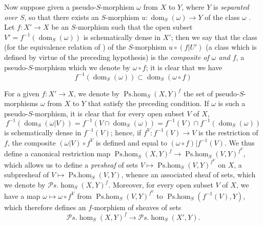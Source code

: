 \begin{env}[20.3.2]\label{IV.20.3.2}
Now suppose given a pseudo-$S$-morphism $\omega$ from $X$ to $Y$, where $Y$ is \emph{separated over $S$}, so that there exists an $S$-morphism $u:\operatorname{dom}_S(\omega)\to Y$ of the class $\omega$ .
Let $f:X'\to X$ be an $S$-morphism such that the open subset $V'=f^{-1}(\operatorname{dom}_S(\omega))$ is schematically dense in $X'$; then we say that the class (for the equivalence relation of ) of the $S$-morphism $u\circ(f|U')$ (a class which is defined by virtue of the preceding hypothesis) is the \emph{composite of $\omega$ and $f$}, a pseudo-$S$-morphism which we denote by $\omega\circ f$; it is clear that we have
\[
\label{IV.20.3.2.1}
  f^{-1}(\operatorname{dom}_S(\omega))\subset\operatorname{dom}_S(\omega\circ f)
  \tag{20.3.2.1}
\]

For a given $f:X'\to X$, we denote by $\operatorname{Ps.hom}_S(X,Y)^f$ the set of pseudo-$S$-morphisms $\omega$ from $X$ to $Y$ that satisfy the preceding condition.
If $\omega$ is such a pseudo-$S$-morphism, it is clear that for every open subset $V$ of $X$,
\[
  f^{-1}(\operatorname{dom}_S(\omega|V))=f^{-1}(V\cap\operatorname{dom}_S(\omega))=f^{-1}(V)\cap f^{-1}(\operatorname{dom}_S(\omega))
\]
is schematically dense in $f^{-1}(V)$; hence, if $f^V:f^{-1}(V)\to V$ is the restriction of $f$, the composite $(\omega|V)\circ f^V$ is defined and equal to $(\omega\circ f)|f^{-1}(V)$.
We thus define a
canonical restriction map $\operatorname{Ps.hom}_S(X,Y)^f\to\operatorname{Ps.hom}_S(V,Y)^{f^V}$, which allows us to define a \emph{presheaf} of sets $V\mapsto\operatorname{Ps.hom}_S(V,Y)^{f^V}$ on $X$, a subpresheaf of $V\mapsto\operatorname{Ps.hom}_S(V,Y)$, whence an associated sheaf of sets, which we denote by $\mathscr{P}\!s.\!\operatorname{hom}_S(X,Y)^f$.
Moreover, for every open subset $V$ of $X$, we have a map $\omega\mapsto\omega\circ f^V$ from $\operatorname{Ps.hom}_S(V,Y)^{f^V}$ to $\operatorname{Ps.hom}_S(f^{-1}(V),Y)$, which therefore defines an $f$-morphism of sheaves of sets
\[
  \mathscr{P}\!s.\!\operatorname{hom}_S(X,Y)^f\to\mathscr{P}\!s.\!\operatorname{hom}_S(X',Y).
\]
\end{env}

